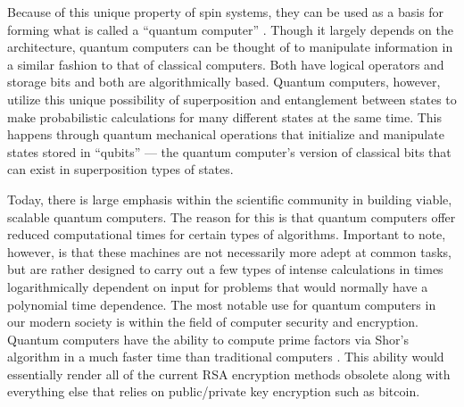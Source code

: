 \documentclass[oneside]{BYUPhys}
\begin{document}
Because of this unique property of spin systems, they can be used as a basis for forming what is called a ``quantum computer'' \cite{RefWorks:doc:58929746e4b0dec22aee3a9a}. Though it largely depends on the architecture, quantum computers can be thought of to manipulate information in a similar fashion to that of classical computers. Both have logical operators and storage bits and both are algorithmically based. Quantum computers, however, utilize this unique possibility of superposition and entanglement between states to make probabilistic calculations for many different states at the same time. This happens through quantum mechanical operations that initialize and manipulate states stored in ``qubits'' --- the quantum computer's version of classical bits that can exist in superposition types of states.

Today, there is large emphasis within the scientific community in building viable, scalable quantum computers. The reason for this is that quantum computers offer reduced computational times for certain types of algorithms. Important to note, however, is that these machines are not necessarily more adept at common tasks, but are rather designed to carry out a few types of intense calculations in times logarithmically dependent on input for problems that would normally have a polynomial time dependence. The most notable use for quantum computers in our modern society is within the field of computer security and encryption. Quantum computers have the ability to compute prime factors via Shor's algorithm in a much faster time than traditional computers \cite{RefWorks:doc:589296c6e4b0d4c09201f6f5}. This ability would essentially render all of the current RSA encryption methods obsolete along with everything else that relies on public/private key encryption such as bitcoin.
\end{document}
